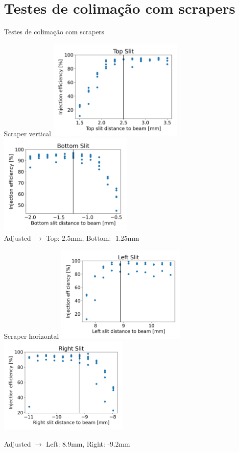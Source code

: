 \documentclass[1610]{beamer}					  %
\begin{document}
\section{Testes de colimação com scrapers}

\begin{frame}
    \Huge{Testes de colimação com scrapers}
\end{frame}

\begin{frame}{Scraper vertical}
    \centering
    \includegraphics[width=0.5\textwidth]{2024-04-19/figures/Top.png}
    \includegraphics[width=0.5\textwidth]{2024-04-19/figures/Bottom.png}
    \\
    \centering
     Adjusted $\to$ Top: 2.5mm, Bottom: -1.25mm
\end{frame}

\begin{frame}{Scraper horizontal}
    \centering
    \includegraphics[width=0.48\textwidth]{2024-04-19/figures/Left.png}
    \includegraphics[width=0.48\textwidth]{2024-04-19/figures/Right.png}

     Adjusted $\to$ Left: 8.9mm, Right: -9.2mm
\end{frame}
\end{document}
